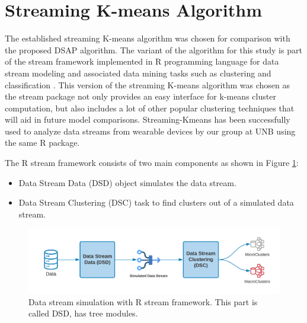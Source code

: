 \section{Streaming K-means Algorithm}
The established streaming K-means algorithm was chosen for comparison with the proposed DSAP algorithm. The variant of the algorithm for this study is part of the stream framework implemented in R programming language for data stream modeling and associated data mining tasks such as clustering and classification \cite{packager}. This version of the streaming K-means algorithm was chosen as the stream package not only provides an easy interface for k-means cluster computation, but also includes a lot of other popular clustering techniques that will aid in future model comparisons. Streaming-Kmeans has been successfully used to analyze data streams from wearable devices by our group at UNB using the same R package. 

The R stream framework consists of two main components as shown in Figure \ref{streammm}:
\begin{itemize}
    \item Data Stream Data (DSD) object simulates the data stream.
    \item Data Stream Clustering (DSC) task to find clusters out of a simulated data stream.
\end{itemize}

\begin{figure}[!h]
    \centering
    \includegraphics[width=.9\textwidth]{image/Chapters/Chapter5/RKmeans.png}
    \caption{ Data stream simulation with R stream framework. This part is called DSD, has tree modules.}
    \label{streammm}
\end{figure}




    

